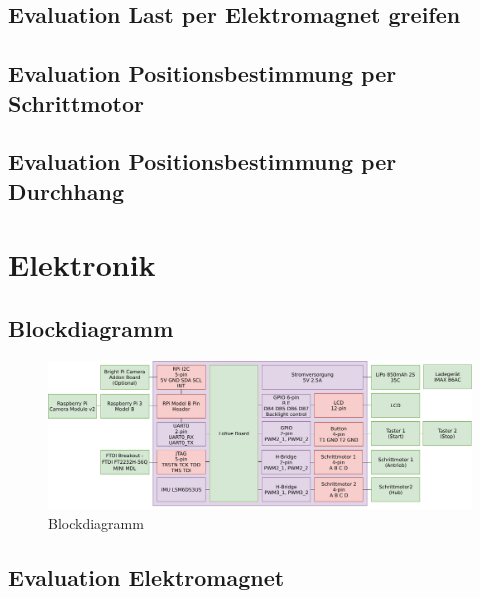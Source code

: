 \documentclass[a4paper]{report}
\begin{document}
\subsection{Evaluation Last per Elektromagnet greifen}


\subsection{Evaluation Positionsbestimmung per Schrittmotor}


\subsection{Evaluation Positionsbestimmung per Durchhang}



\section{Elektronik}
\subsection{Blockdiagramm}
\begin{figure}[h!]
  \includegraphics[keepaspectratio,width=\textwidth]{BlockdiagrammElektronik}
  \caption{Blockdiagramm}
  \label{fig:ElektronikBlockdiagramm}
\end{figure}
\newpage
\subsection{Evaluation Elektromagnet}
\end{document}
